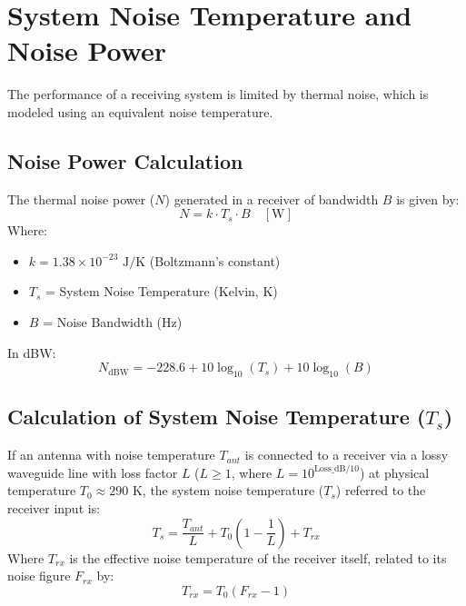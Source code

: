 \documentclass[12pt,a4paper]{article}
\begin{document}
\section{System Noise Temperature and Noise Power}

The performance of a receiving system is limited by thermal noise, which is modeled using an equivalent noise temperature.

\subsection{Noise Power Calculation}
The thermal noise power ($N$) generated in a receiver of bandwidth $B$ is given by:
\begin{equation}
  N = k \cdot T_s \cdot B \quad [\text{W}]
\end{equation}
Where:
\begin{itemize}[leftmargin=*, itemsep=3pt]
  \item $k = 1.38 \times 10^{-23} \text{ J/K}$ (Boltzmann's constant)
  \item $T_s$ = System Noise Temperature (Kelvin, K)
  \item $B$ = Noise Bandwidth (Hz)
\end{itemize}
In dBW:
\begin{equation}
  N_{\text{dBW}} = -228.6 + 10\log_{10}(T_s) + 10\log_{10}(B)
\end{equation}

\subsection{Calculation of System Noise Temperature ($T_s$)}
If an antenna with noise temperature $T_{ant}$ is connected to a receiver via a lossy waveguide line with loss factor $L$ ($L \ge 1$, where $L = 10^{\text{Loss\_dB}/10}$) at physical temperature $T_0 \approx 290\text{ K}$, the system noise temperature ($T_s$) referred to the receiver input is:
\begin{equation}
  T_s = \frac{T_{ant}}{L} + T_{0}\left(1 - \frac{1}{L}\right) + T_{rx}
\end{equation}
Where $T_{rx}$ is the effective noise temperature of the receiver itself, related to its noise figure $F_{rx}$ by:
\begin{equation}
  T_{rx} = T_0 (F_{rx} - 1)
\end{equation}
\end{document}
